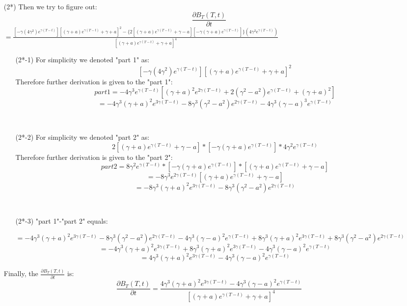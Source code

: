 \documentclass[14pt]{extarticle}
\begin{document}
\begin{itemize}
    \item [(2*)]Then we try to figure out:
    $$ \frac{ \partial B_T (T,t) }{ \partial t}$$
    $ =\frac{[-\gamma (4\gamma^2) e^{\gamma(T-t)}] [(\gamma+a) e^{\gamma(T-t)}+\gamma+a]^2 -\{2[ (\gamma+a) e^{\gamma(T-t)}+\gamma-a][-\gamma(\gamma+a)e^{\gamma(T-t)}] \}(4\gamma^2e^{\gamma(T-t)}) }    {[(\gamma+a) e^{\gamma(T-t)}+\gamma+a]^4}   $
~\\
    \begin{itemize}
        \item [(2*-1)] For simplicity we denoted "part 1" as:
        $$ [-\gamma (4\gamma^2) e^{\gamma(T-t)}] [(\gamma+a) e^{\gamma(T-t)}+\gamma+a]^2$$
        Therefore further derivation is given to the "part 1":
        $$ part 1 = -4\gamma^3 e^{\gamma(T-t)} [(\gamma+a)^2e^{2\gamma(T-t)}+2(\gamma^2-a^2)e^{\gamma(T-t)}+(\gamma+a)^2]                $$
        $$=-4\gamma^3(\gamma+a)^2 e^{3\gamma(T-t)} -8\gamma^3(\gamma^2-a^2)e^{2\gamma(T-t)}-4\gamma^3(\gamma-a)^3 e^{\gamma(T-t)}           $$
    \end{itemize}
    ~\\
    \begin{itemize}
        \item [(2*-2)] For simplicity we denoted "part 2" as:
        $$2[ (\gamma+a) e^{\gamma(T-t)}+\gamma-a]  *[-\gamma(\gamma+a)e^{\gamma(T-t)}]*4\gamma^2e^{\gamma(T-t)}$$
        Therefore further derivation is given to the "part 2":
        $$ part 2=8\gamma^2e^{\gamma(T-t)}*[-\gamma(\gamma+a)e^{\gamma(T-t)}]*[(\gamma+a)e^{\gamma(T-t)}+\gamma-a]  $$
        $$=-8\gamma^3e^{2\gamma(T-t)}[(\gamma+a)e^{\gamma(T-t)}+\gamma-a]$$
        $$=-8\gamma^3(\gamma+a)^2e^{3\gamma(T-t)} -8\gamma^3(\gamma^2-a^2)e^{2\gamma(T-t)}$$
    \end{itemize}
    ~\\
    \begin{itemize}
        \item [(2*-3)] "part 1"-"part 2" equals:
        
        $=-4\gamma^3(\gamma+a)^2 e^{3\gamma(T-t)} -8\gamma^3(\gamma^2-a^2)e^{2\gamma(T-t)}-4\gamma^3(\gamma-a)^2 e^{\gamma(T-t)}+8\gamma^3(\gamma+a)^2e^{3\gamma(T-t)}+8\gamma^3(\gamma^2-a^2)e^{2\gamma(T-t)} $
        ~\\
        $$ = -4\gamma^3(\gamma+a)^2 e^{3\gamma(T-t)}+ 8\gamma^3(\gamma+a)^2e^{3\gamma(T-t)}-4\gamma^3(\gamma-a)^2 e^{\gamma(T-t)}   $$
        $$=4\gamma^3(\gamma+a)^2e^{3\gamma(T-t)}-4\gamma^3(\gamma-a)^2e^{\gamma(T-t)} $$
    \end{itemize}
    Finally, the $\frac{ \partial B_T (T,t) }{ \partial t} $ is:
    $$  \frac{ \partial B_T (T,t) }{ \partial t}= \frac{4\gamma^3(\gamma+a)^2e^{3\gamma(T-t)}-4\gamma^3(\gamma-a)^2e^{\gamma(T-t)}} {[(\gamma+a) e^{\gamma(T-t)}+\gamma+a]^4}$$
    
\end{itemize}
\end{document}
